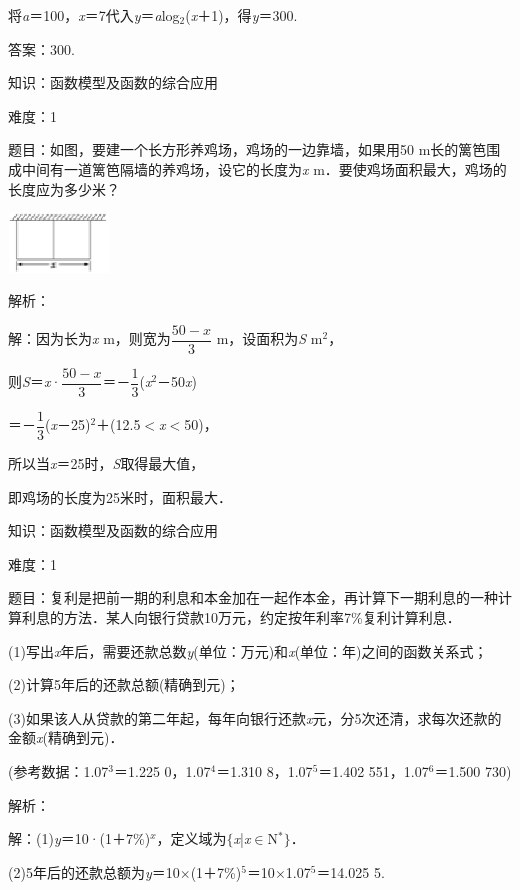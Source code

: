 \documentclass{article} %
\begin{document}
将\textit{a}＝100，\textit{x}＝7代入\textit{y}＝\textit{a}log${}_{2}$(\textit{x}＋1)，得\textit{y}＝300.

答案：300.

知识：函数模型及函数的综合应用

难度：1

题目：如图，要建一个长方形养鸡场，鸡场的一边靠墙，如果用50 m长的篱笆围成中间有一道篱笆隔墙的养鸡场，设它的长度为\textit{x} m．要使鸡场面积最大，鸡场的长度应为多少米？

\includegraphics*[width=1.06in, height=0.62in, keepaspectratio=false]{image76}

解析：

解：因为长为\textit{x} m，则宽为$\dfrac{50-x}{3}$ m，设面积为\textit{S} m${}^{2}$，

则\textit{S}＝\textit{x}·$\dfrac{50-x}{3}$＝－$\dfrac{1}{3}$(\textit{x}${}^{2}$－50\textit{x})

＝－$\dfrac{1}{3}$(\textit{x}－25)${}^{2}$＋(12.5$\mathrm{<}$\textit{x}$\mathrm{<}$50)，

所以当\textit{x}＝25时，\textit{S}取得最大值，

即鸡场的长度为25米时，面积最大．

知识：函数模型及函数的综合应用

难度：1

题目：复利是把前一期的利息和本金加在一起作本金，再计算下一期利息的一种计算利息的方法．某人向银行贷款10万元，约定按年利率7\%复利计算利息．

(1)写出\textit{x}年后，需要还款总数\textit{y}(单位：万元)和\textit{x}(单位：年)之间的函数关系式；

(2)计算5年后的还款总额(精确到元)；

(3)如果该人从贷款的第二年起，每年向银行还款\textit{x}元，分5次还清，求每次还款的金额\textit{x}(精确到元)．

(参考数据：1.07${}^{3}$＝1.225 0，1.07${}^{4}$＝1.310 8，1.07${}^{5}$＝1.402 551，1.07${}^{6}$＝1.500 730)

解析：

解：(1)\textit{y}＝10·(1＋7\%)\textit{${}^{x}$}，定义域为$\mathrm{\{}$\textit{x}|\textit{x}$\mathrm{\in}$N${}^{*}$$\mathrm{\}}$．

(2)5年后的还款总额为\textit{y}＝10$\mathrm{\times}$(1＋7\%)${}^{5}$＝10$\mathrm{\times}$1.07${}^{5}$＝14.025 5.
\end{document}
